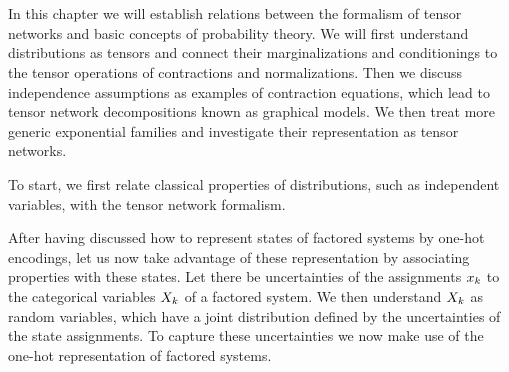 \chapter{\chatextprobRepresentation}\label{cha:probRepresentation}

In this chapter we will establish relations between the formalism of tensor networks and basic concepts of probability theory.
We will first understand distributions as tensors and connect their marginalizations and conditionings to the tensor operations of contractions and normalizations.
Then we discuss independence assumptions as examples of contraction equations, which lead to tensor network decompositions known as graphical models.
We then treat more generic exponential families and investigate their representation as tensor networks.



To start, we first relate classical properties of distributions, such as independent variables, with the tensor network formalism.


After having discussed how to represent states of factored systems by one-hot encodings, let us now take advantage of these representation by associating properties with these states.
Let there be uncertainties of the assignments $x_{k}$ to the categorical variables $X_{k}$ of a factored system.
We then understand $X_{k}$ as random variables, which have a joint distribution defined by the uncertainties of the state assignments.
To capture these uncertainties we now make use of the one-hot representation of factored systems.

